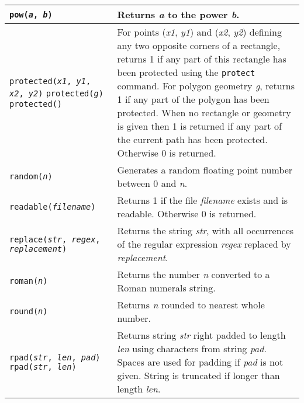 \begin{longtable}{|p{5cm}|p{7cm}|}
\hline

\texttt{pow(\textit{a}, \textit{b})} &
Returns \textit{a} to the power \textit{b}. \\

\hline

\texttt{protected(\textit{x1}, \textit{y1}, \textit{x2}, \textit{y2})}
\texttt{protected(\textit{g})}
\texttt{protected()} &
For points
(\textit{x1}, \textit{y1}) and (\textit{x2}, \textit{y2}) defining
any two opposite corners of a rectangle, returns 1 if any part of
this rectangle has been protected using the \texttt{protect} command.
For polygon geometry \textit{g}, returns 1 if any part of the polygon
has been protected.
When no rectangle or geometry is given then 1 is returned if any
part of the current path has been protected.
Otherwise 0 is returned. \\

\hline

\texttt{random(\textit{n})} &
Generates a random floating point number between 0 and \textit{n}. \\

\hline

\texttt{readable(\textit{filename})} &
Returns 1 if the file \textit{filename} exists and is readable.
Otherwise 0 is returned. \\

\hline

\texttt{replace(\textit{str}, \textit{regex}, \textit{replacement})} &
Returns the string \textit{str}, with all occurrences of the regular
expression \textit{regex} replaced by \textit{replacement}. \\

\hline

\texttt{roman(\textit{n})} &
Returns the number \textit{n} converted to a Roman numerals string. \\

\hline

\texttt{round(\textit{n})} &
Returns \textit{n} rounded to nearest whole number. \\

\hline

\texttt{rpad(\textit{str}, \textit{len}, \textit{pad})}
\texttt{rpad(\textit{str}, \textit{len})} &
Returns string \textit{str} right padded to length \textit{len}
using characters from string \textit{pad}.
Spaces are used for padding if \textit{pad} is not given.
String is truncated if longer than length \textit{len}. \\


\end{longtable}

